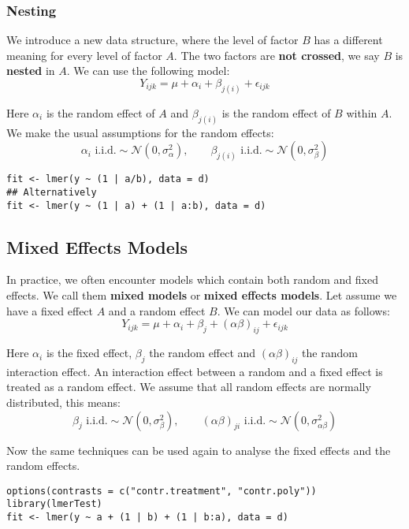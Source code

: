 \subsubsection{Nesting}

We introduce a new data structure, where the level of factor $B$ has a different meaning for every level of factor $A$. The two factors are \textbf{not crossed}, we say $B$ is \textbf{nested} in $A$. We can use the following model:
$$Y_{ijk} = \mu + \alpha_i + \beta_{j(i)} + \epsilon_{ijk}$$

Here $\alpha_i$ is the random effect of $A$ and $\beta_{j(i)}$ is the random effect of $B$ within $A$. We make the usual assumptions for the random effects:
$$\alpha_i \text{ i.i.d.} \sim \mathcal{N}(0, \sigma_\alpha^2), \qquad \beta_{j(i)} \text{ i.i.d.} \sim \mathcal{N}(0, \sigma_\beta^2)$$

\begin{lstlisting}
fit <- lmer(y ~ (1 | a/b), data = d)
## Alternatively
fit <- lmer(y ~ (1 | a) + (1 | a:b), data = d)
\end{lstlisting}

\subsection{Mixed Effects Models}

In practice, we often encounter models which contain both random and fixed effects. We call them \textbf{mixed models} or \textbf{mixed effects models}. Let assume we have a fixed effect $A$ and a random effect $B$. We can model our data as follows:
$$Y_{ijk} = \mu + \alpha_i + \beta_j + (\alpha \beta)_{ij} + \epsilon_{ijk}$$

Here $\alpha_i$ is the fixed effect, $\beta_j$ the random effect and $(\alpha \beta)_{ij}$ the random interaction effect. An interaction effect between a random and a fixed effect is treated as a random effect. We assume that all random effects are normally distributed, this means:
$$\beta_j \text{ i.i.d.} \sim \mathcal{N}(0, \sigma_\beta^2), \qquad (\alpha\beta)_{ji} \text{ i.i.d.} \sim \mathcal{N}(0, \sigma_{\alpha\beta}^2)$$

Now the same techniques can be used again to analyse the fixed effects and the random effects.
\begin{lstlisting}
options(contrasts = c("contr.treatment", "contr.poly"))
library(lmerTest)
fit <- lmer(y ~ a + (1 | b) + (1 | b:a), data = d)
\end{lstlisting}
